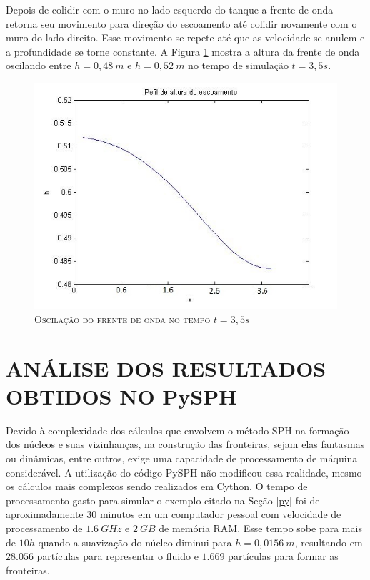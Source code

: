   Depois de colidir com o muro no lado esquerdo do tanque a frente de onda retorna seu movimento para direção do escoamento até colidir novamente com o muro do lado direito. Esse movimento se repete até que as velocidade se anulem e a profundidade se torne constante. A Figura \ref{Alt350s} mostra a altura da frente de onda oscilando entre $h=0,48 \ m$ e $h=0,52 \ m$ no tempo de simulação $t=3,5s$.
  \begin{figure}[H]
  	\centering
  	\includegraphics[scale=1]{figuras/Alt350s.jpg}
  	\caption{\textsc{Oscilação do frente de onda no tempo $t=3,5s$}}
  	\label{Alt350s}
  \end{figure}   	      
 
   
\section{ANÁLISE DOS RESULTADOS OBTIDOS NO PySPH} \label{REPy}

Devido à complexidade dos cálculos que envolvem o método SPH na formação dos núcleos e suas vizinhanças, na construção das fronteiras, sejam elas fantasmas ou dinâmicas, entre outros, exige uma capacidade de processamento de máquina considerável. A utilização do código PySPH não modificou essa realidade, mesmo os cálculos mais complexos sendo realizados em Cython. O tempo de processamento gasto para simular o exemplo citado na Seção \ref{py} foi de aproximadamente $30$ minutos em um computador pessoal com velocidade de processamento de $1.6 \  GHz$ e $2 \ GB$ de memória RAM. Esse tempo sobe para mais de $10h$ quando a suavização do núcleo diminui para $h=0,0156 \ m$, resultando em $28.056$ partículas para representar o fluido e $1.669$ partículas para formar as fronteiras.

